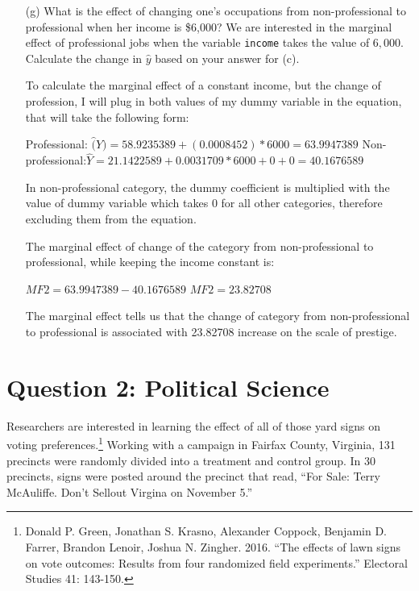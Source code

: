 \documentclass[12pt,letterpaper]{article}
\begin{document}
\begin{enumerate}
	
	\vspace{1cm}
	
	
	\item [(g)]
	What is the effect of changing one's occupations from non-professional to professional when her income is \$6,000? We are interested in the marginal effect of professional jobs when the variable \texttt{income} takes the value of $6,000$. Calculate the change in $\hat{y}$ based on your answer for (c).
	
	To calculate the marginal effect of a constant income, but the change of profession, I will plug in both values of my dummy variable in the equation, that will take the following form: 
	
	Professional: $\hat(Y) = 58.9235389 + (0.0008452)*6000 = 63.9947389$ 
	Non-professional:$\hat{Y} = 21.1422589 + 0.0031709*6000 + 0 + 0 = 40.1676589$
	
	In non-professional category, the dummy coefficient is multiplied with the value of dummy variable which takes 0 for all other categories, therefore excluding them from the equation. 
	
	The marginal effect of change of the category from non-professional to professional, while keeping the income constant is: 
	
	$MF2 = 63.9947389 - 40.1676589$
	$MF2 = 23.82708$
	
	The marginal effect tells us that the change of category from non-professional to professional is associated with 23.82708 increase on the scale of prestige.       
	
\end{enumerate}

\newpage

\section*{Question 2: Political Science}
\vspace{.25cm}
\noindent 	Researchers are interested in learning the effect of all of those yard signs on voting preferences.\footnote{Donald P. Green, Jonathan	S. Krasno, Alexander Coppock, Benjamin D. Farrer,	Brandon Lenoir, Joshua N. Zingher. 2016. ``The effects of lawn signs on vote outcomes: Results from four randomized field experiments.'' Electoral Studies 41: 143-150. } Working with a campaign in Fairfax County, Virginia, 131 precincts were randomly divided into a treatment and control group. In 30 precincts, signs were posted around the precinct that read, ``For Sale: Terry McAuliffe. Don't Sellout Virgina on November 5.'' \\
\end{document}
